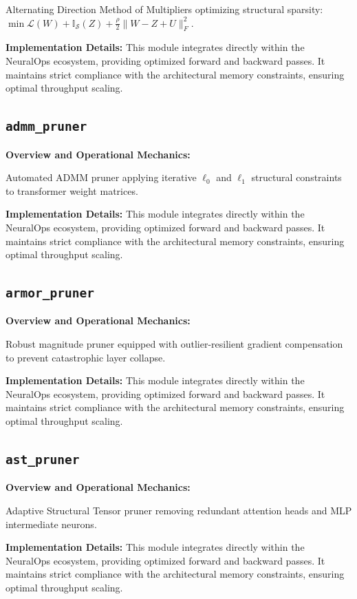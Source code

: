 \documentclass[10pt,twocolumn,letterpaper]{article}
\begin{document}
Alternating Direction Method of Multipliers optimizing structural sparsity: $\min \mathcal{L}(W) + \mathbb{I}_{\mathcal{S}}(Z) + \frac{\rho}{2}\|W - Z + U\|_F^2$.

\textbf{Implementation Details:}
This module integrates directly within the NeuralOps ecosystem, providing optimized forward and backward passes. It maintains strict compliance with the architectural memory constraints, ensuring optimal throughput scaling.

\subsection{\texttt{admm\_pruner}}
\textbf{Overview and Operational Mechanics:}

Automated ADMM pruner applying iterative $\ell_0$ and $\ell_1$ structural constraints to transformer weight matrices.

\textbf{Implementation Details:}
This module integrates directly within the NeuralOps ecosystem, providing optimized forward and backward passes. It maintains strict compliance with the architectural memory constraints, ensuring optimal throughput scaling.

\subsection{\texttt{armor\_pruner}}
\textbf{Overview and Operational Mechanics:}

Robust magnitude pruner equipped with outlier-resilient gradient compensation to prevent catastrophic layer collapse.

\textbf{Implementation Details:}
This module integrates directly within the NeuralOps ecosystem, providing optimized forward and backward passes. It maintains strict compliance with the architectural memory constraints, ensuring optimal throughput scaling.

\subsection{\texttt{ast\_pruner}}
\textbf{Overview and Operational Mechanics:}

Adaptive Structural Tensor pruner removing redundant attention heads and MLP intermediate neurons.

\textbf{Implementation Details:}
This module integrates directly within the NeuralOps ecosystem, providing optimized forward and backward passes. It maintains strict compliance with the architectural memory constraints, ensuring optimal throughput scaling.
\end{document}

